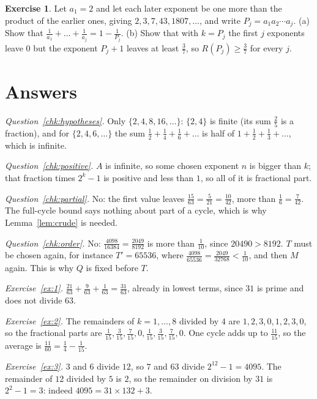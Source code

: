 \documentclass[10pt]{article}
\theoremstyle{plain}
\theoremstyle{definition}
\newtheorem{exercise}{Exercise}
\theoremstyle{remark}
\begin{document}
\begin{exercise}\label{ex:6}
Let $a_1=2$ and let each later exponent be one more than the product of the
earlier ones, giving $2,3,7,43,1807,\dots$, and write $P_j=a_1a_2\cdots a_j$.
(a) Show that $\tfrac1{a_1}+\dots+\tfrac1{a_j}=1-\tfrac1{P_j}$. (b) Show that
with $k=P_j$ the first $j$ exponents leave $0$ but the exponent $P_j+1$ leaves at
least $\tfrac37$, so $R(P_j)\ge\tfrac37$ for every $j$.
\end{exercise}

\section{Answers}\label{app:answers}
\begingroup
\setlength{\parskip}{0.7ex plus 0.2ex}
\setlength{\parindent}{0pt}

\emph{Question~\ref{chk:hypotheses}.} Only $\{2,4,8,16,\dots\}$: $\{2,4\}$ is
finite (its sum $\tfrac25$ is a fraction), and for $\{2,4,6,\dots\}$ the sum
$\tfrac12+\tfrac14+\tfrac16+\dots$ is half of $1+\tfrac12+\tfrac13+\dots$,
which is infinite.

\emph{Question~\ref{chk:positive}.} $A$ is infinite, so some chosen exponent $n$
is bigger than $k$; that fraction times $2^k-1$ is positive and less than $1$,
so all of it is fractional part.

\emph{Question~\ref{chk:partial}.} No: the first value leaves
$\tfrac{15}{63}=\tfrac5{21}=\tfrac{10}{42}$, more than $\tfrac16=\tfrac7{42}$.
The full-cycle bound says nothing about part of a cycle, which is why
Lemma~\ref{lem:crude} is needed.

\emph{Question~\ref{chk:order}.} No:
$\tfrac{4098}{16384}=\tfrac{2049}{8192}$ is more than $\tfrac1{10}$, since
$20490>8192$. $T$ must be chosen again, for instance $T'=65536$, where
$\tfrac{4098}{65536}=\tfrac{2049}{32768}<\tfrac1{10}$, and then $M$ again. This
is why $Q$ is fixed before $T$.

\emph{Exercise~\ref{ex:1}.} $\tfrac{21}{63}+\tfrac9{63}+\tfrac1{63}=\tfrac{31}{63}$,
already in lowest terms, since $31$ is prime and does not divide $63$.

\emph{Exercise~\ref{ex:2}.} The remainders of $k=1,\dots,8$ divided by $4$ are
$1,2,3,0,1,2,3,0$, so the fractional parts are
$\tfrac1{15},\tfrac3{15},\tfrac7{15},0,\tfrac1{15},\tfrac3{15},\tfrac7{15},0$.
One cycle adds up to $\tfrac{11}{15}$, so the average is
$\tfrac{11}{60}=\tfrac14-\tfrac1{15}$.

\emph{Exercise~\ref{ex:3}.} $3$ and $6$ divide $12$, so $7$ and $63$ divide
$2^{12}-1=4095$. The remainder of $12$ divided by $5$ is $2$, so the remainder
on division by $31$ is $2^2-1=3$: indeed $4095=31\times132+3$.
\end{document}
